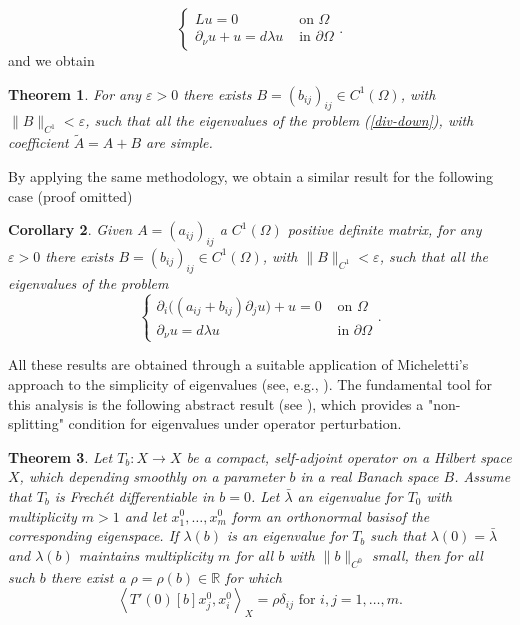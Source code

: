 \documentclass[a4paper,reqno,11pt,oneside]{amsart}
\theoremstyle{plain}
\newtheorem{thm}{Theorem}
\theoremstyle{plain}
\theoremstyle{plain}
\newtheorem{cor}[thm]{Corollary}
\theoremstyle{remark}
\begin{document}
\begin{equation}\label{div-down}  
   \left\{
    \begin{array}{cc}
         L u=0& \text{ on } \Omega\\
         \partial_\nu u+ u=d\lambda u & \text{ in } \partial \Omega
    \end{array}.
    \right.
\end{equation}
and we obtain

\begin{thm}
\label{thm:div}
For any $\varepsilon>0$ there exists $B=(b_{ij})_{ij}\in C^{1}(\Omega)$, with $\|B\|_{C^1}<\varepsilon$, 
  such that all the eigenvalues of  the problem (\ref{div-down}), with coefficient $\tilde A=A+B$ are simple.
\end{thm}
By applying the same methodology, we obtain a similar result for the following case (proof omitted)
\begin{cor}\label{thm:div-up}
Given $A=(a_{ij})_{ij}$ a $C^1(\Omega)$ positive definite matrix, for any $\varepsilon>0$ there exists $B=(b_{ij})_{ij}\in C^{1}(\Omega)$, with $\|B\|_{C^1}<\varepsilon$, 
  such that all the eigenvalues of  the problem 
  \begin{equation} 
   \left\{
    \begin{array}{cc}
        \partial_i \Big((a_{ij}+b_{ij})\partial_j u\Big) +u=0& \text{ on } \Omega\\
         \partial_\nu u=d\lambda u & \text{ in } \partial \Omega
    \end{array}.
    \right.
\end{equation}
\end{cor}

All these results are obtained through a suitable application of Micheletti’s approach to the simplicity of eigenvalues (see, e.g., \cite{mi1,mi2,Lupo}). The fundamental tool for this analysis is the following abstract result (see \cite{mi2, fgmp}), which provides a "non-splitting" condition for eigenvalues under operator perturbation.

\begin{thm}\label{thm:astratto} 
Let $T_{b}:X\rightarrow X$ be a compact, self-adjoint operator on a Hilbert space $X$, which depending smoothly on a parameter $b$ in a real Banach space $B$. 
Assume that $T_{b}$ is Frechét differentiable in $b=0$. Let $\bar{\lambda}$ an eigenvalue for $T_0$ with multiplicity $m>1$  and let $x_{1}^{0},\dots,x_{m}^{0}$ form an orthonormal basisof the corresponding eigenspace. If  $\lambda(b)$ is an eigenvalue for $T_{b}$ such that $\lambda(0)=\bar\lambda$ and  $\lambda(b)$ maintains multiplicity $m$ for all $b$ with $\|b\|_{C^{0}}$ small, then for all such $b$ there exist a $\rho=\rho(b)\in\mathbb{R}$
for which
\begin{equation}
\left\langle T'(0)[b]x_{j}^{0},x_{i}^{0}\right\rangle _{X}=\rho\delta_{ij}\text{ for }i,j=1,\dots,m.
\label{eq:spezzamentoastratto}
\end{equation}
\end{thm}
\end{document}
